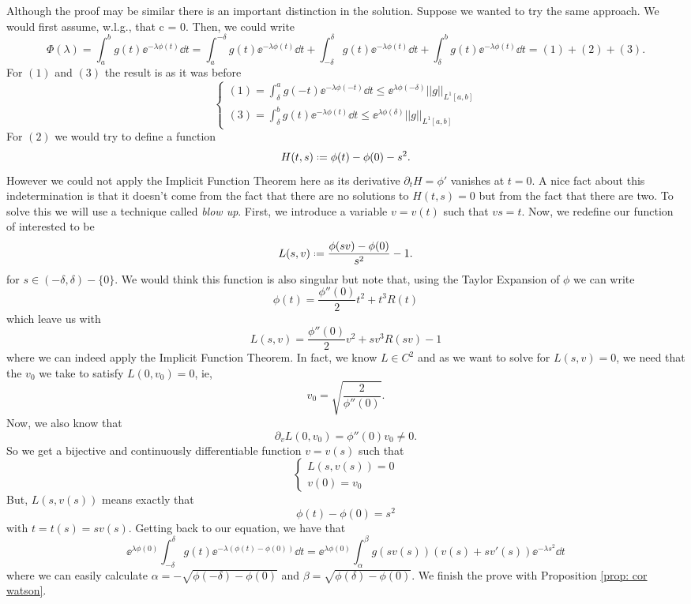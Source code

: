 \begin{Mproof}
	Although the proof may be similar there is an important distinction in the solution. Suppose we wanted to try the same approach. We would first assume, w.l.g., that c = 0. Then, we could write
	$$ \Phi(\lambda) = \int_{a}^{b} g(t) \ee^{-\lambda \phi(t)} \dd t = \int_{a}^{-\delta} g(t) \ee^{-\lambda \phi(t)} \dd t + \int_{-\delta}^{\delta} g(t) \ee^{-\lambda \phi(t)} \dd t + \int_{\delta}^{b} g(t) \ee^{-\lambda \phi(t)} \dd t = (1) + (2) + (3).$$
	For $(1)$ and $(3)$ the result is as it was before
	\begin{equation*}
		\begin{cases}
			(1)	= \int_{\delta}^{a} g(-t) \ee^{-\lambda \phi(-t)} \dd t \leq \ee^{\lambda \phi(-\delta)} ||g||_{L^1[a,b]}\\
			(3) = \int_{\delta}^{b} g(t) \ee^{-\lambda \phi(t)} \dd t \leq \ee^{\lambda \phi(\delta)} ||g||_{L^1[a,b]}
		\end{cases}
	\end{equation*}
	For $(2)$ we would try to define a function 
	$$H(t,s) \deff \phi(t) - \phi(0) - s^2.$$
	However we could not apply the Implicit Function Theorem here as its derivative $\partial_t H = \phi'$ vanishes at $t=0$. A nice fact about this indetermination is that it doesn't come from the fact that there are no solutions to $H(t,s) = 0$ but from the fact that there are two. To solve this we will use a technique called \textit{blow up}. First, we introduce a variable $v = v(t)$ such that $vs = t$. Now, we redefine our function of interested to be
	$$L(s, v) \deff \frac{\phi(sv) - \phi(0)}{s^2} - 1.$$
	for $s\in(-\delta, \delta) - \{0\}$. We would think this function is also singular but note that, using the Taylor Expansion of $\phi$ we can write
	$$\phi(t) = \frac{\phi''(0)}{2}t^2 + t^3R(t) $$
	which leave us with 
	$$L(s, v) = \frac{\phi''(0)}{2}v^2 + sv^3R(sv) - 1 $$
	where we can indeed apply the Implicit Function Theorem. In fact, we know $L \in C^2$ and as we want to solve for $L(s,v) = 0$, we need that the $v_0$ we take to satisfy $L(0, v_0) = 0$, ie,
	$$v_0 = \sqrt{\frac{2}{\phi''(0)}}.$$
	Now, we also know that
	$$\partial_v L(0, v_0) = \phi''(0) v_0 \neq 0.$$
	So we get a bijective and continuously differentiable function $v = v(s)$ such that
	\begin{equation*}
		\begin{cases}
			L(s, v(s)) = 0 \\
			v(0) = v_0
		\end{cases}
	\end{equation*}
	But, $L(s, v(s))$ means exactly that
	$$\phi(t) - \phi(0) = s^2$$
	with $t = t(s) = sv(s)$. Getting back to our equation, we have that
	$$ \ee^{\lambda \phi(0)} \int_{-\delta}^{\delta} g(t) \ee^{-\lambda (\phi(t)-\phi(0))} \dd t = \ee^{\lambda \phi(0)} \int_{\alpha}^{\beta} g(sv(s)) (v(s) + sv'(s)) \ee^{-\lambda s^2} \dd t$$
	where we can easily calculate $\alpha = - \sqrt{\phi(-\delta) - \phi(0)}$ and $\beta = \sqrt{\phi(\delta) - \phi(0)}$. We finish the prove with Proposition \ref{prop: cor watson}.
\end{Mproof}


 